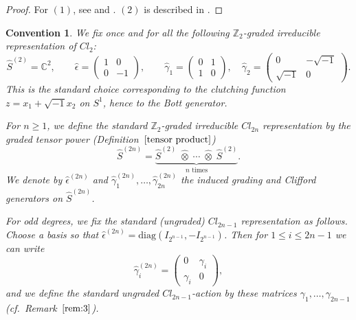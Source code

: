\documentclass{amsart}
\newtheorem{convention}[thm]{Convention}
\theoremstyle{definition}
\theoremstyle{remark}
\begin{document}
\begin{proof}
For $(1)$, see \cite{A-B-S} and \cite{Lawson}. $(2)$ is described in \cite{Furuta}.

\end{proof}


\begin{convention}\label{conv:std-cliff}
We fix once and for all the following $\mathbb{Z}_2$-graded irreducible representation
of $Cl_2$:
\[
\hat S^{(2)}=\mathbb{C}^2,\qquad
\hat\epsilon=
\begin{pmatrix}1&0\\0&-1\end{pmatrix},\qquad
\hat\gamma_1=
\begin{pmatrix}0&1\\1&0\end{pmatrix},\quad
\hat\gamma_2=
\begin{pmatrix}0&-\sqrt{-1}\\ \sqrt{-1}&0\end{pmatrix}.
\]
This is the standard choice corresponding to the clutching function
$z=x_1+\sqrt{-1}x_2$ on $S^1$, hence to the Bott generator.

For $n\ge 1$, we define the standard $\mathbb{Z}_2$-graded irreducible $Cl_{2n}$ representation
by the graded tensor power (Definition~$\ref{tensor product}$)
\[
\hat S^{(2n)}=\underbrace{\hat S^{(2)}\;\hat\otimes\;\cdots\;\hat\otimes\;\hat S^{(2)}}_{n\text{ times}}.
\]
We denote by $\hat\epsilon^{(2n)}$ and $\hat\gamma^{(2n)}_1,\dots,\hat\gamma^{(2n)}_{2n}$
the induced grading and Clifford generators on $\hat S^{(2n)}$.

For odd degrees, we fix the standard (ungraded) $Cl_{2n-1}$ representation as follows.
Choose a basis so that $\hat\epsilon^{(2n)}=\mathrm{diag}(I_{2^{n-1}},-I_{2^{n-1}})$.
Then for $1\le i\le 2n-1$ we can write
\[
\hat\gamma^{(2n)}_i=
\begin{pmatrix}0&\gamma_i\\ \gamma_i&0\end{pmatrix},
\]
and we \emph{define} the standard ungraded $Cl_{2n-1}$-action by these matrices
$\gamma_1,\dots,\gamma_{2n-1}$ (cf.\ Remark~$\ref{rem:3}$).
\end{convention}
\end{document}
